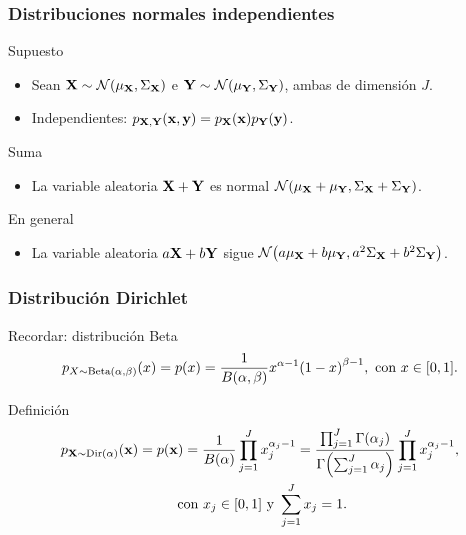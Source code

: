 \documentclass[table]{beamer}
\begin{document}
\begin{frame}
    \frametitle{Distribuciones normales independientes}
    \begin{block}{Supuesto}
        \begin{itemize}
            \item Sean $\Xvec \sim \normal{\mu_{\Xvec}}{\Sigma_{\Xvec}}$
                e $\Yvec \sim \normal{\mu_{\Yvec}}{\Sigma_{\Yvec}}$, ambas de dimensión $J$.
            \item Independientes: $\ppdf{\Xvec , \Yvec}{\xvec , \yvec} = \ppdf{\Xvec}{\xvec} \ppdf{\Yvec}{\yvec}$.
        \end{itemize}
    \end{block}
    \begin{block}{Suma}
        \begin{itemize}
            \item La variable aleatoria $\mathbf{X} + \mathbf{Y}$ es normal $\normal{\mu_{\Xvec} + \mu_{\Yvec}}{\Sigma_{\Xvec} + \Sigma_{\Yvec}}$.
        \end{itemize}
    \end{block}
    \begin{block}{En general}
        \begin{itemize}
            \item La variable aleatoria $a \mathbf{X} + b \mathbf{Y}$ sigue $\normal{a \mu_{\Xvec} + b \mu_{\Yvec}}{a^{2} \Sigma_{\Xvec} + b^{2} \Sigma_{\Yvec}}$.
        \end{itemize}
    \end{block}
\end{frame}

\begin{frame}
    \frametitle{Distribución Dirichlet}
    \begin{block}{Recordar: distribución Beta}
        \begin{equation*}
            \ppdf{X \sim \betadist{\alpha}{\beta}}{x} = \pdf{x} = \frac{1}{\betafunc{\alpha}{\beta}} x^{\alpha - 1} \parens{1 - x}^{\beta - 1} , \text{ con } x \in \sparens{0, 1} .
        \end{equation*}
    \end{block}
    \begin{block}{Definición}
        \begin{multline*}
            \ppdf{\Xvec \sim \dirichlet{\mathbf{\alpha}}}{\xvec} = \pdf{\xvec} = \frac{1}{B \parens{\mathbf{\alpha}}} \prod_{j = 1}^{J} x_{j}^{\alpha_{j} - 1}
            =
            \frac{\prod_{j = 1}^{J} \gammafunc{\alpha_{j}}}{\gammafunc{\sum_{j = 1}^{J} \alpha_{j}}} \prod_{j = 1}^{J} x_{j}^{\alpha_{j} - 1}
            ,
            \\
            \text{ con } x_{j} \in \sparens{0, 1} \text{ y } \sum_{j = 1}^{J} x_{j} = 1 .
        \end{multline*}
    \end{block}
\end{frame}
\end{document}
